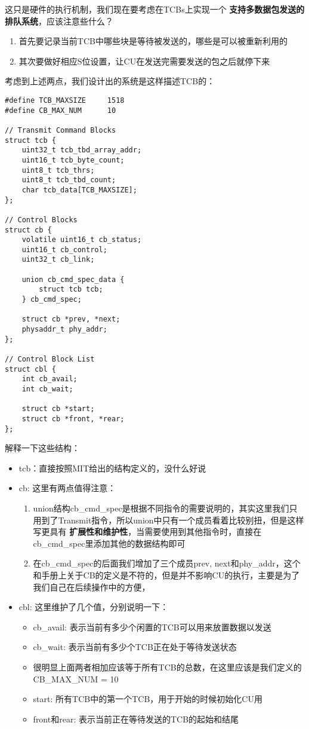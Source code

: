 \documentclass{article}
\newcommand{\highlight}[1]{{\bfseries \color{red}  #1}}
\begin{document}
\begin{CJK*}{UTF8}{gkai}
这只是硬件的执行机制，我们现在要考虑在TCBs上实现一个\highlight{支持多数据包发送的排队系统}，应该注意些什么？

\begin{enumerate}
\item{首先要记录当前TCB中哪些块是等待被发送的，哪些是可以被重新利用的}
\item{其次要做好相应S位设置，让CU在发送完需要发送的包之后就停下来}
\end{enumerate}

考虑到上述两点，我们设计出的系统是这样描述TCB的：

\begin{lstlisting}[style=ccode, title={\scriptsize \ttfamily \bfseries kern/e100.h}]
#define TCB_MAXSIZE     1518
#define CB_MAX_NUM      10

// Transmit Command Blocks
struct tcb {
    uint32_t tcb_tbd_array_addr;
    uint16_t tcb_byte_count;
    uint8_t tcb_thrs;
    uint8_t tcb_tbd_count;
    char tcb_data[TCB_MAXSIZE];
};

// Control Blocks
struct cb {
    volatile uint16_t cb_status;
    uint16_t cb_control;
    uint32_t cb_link;

    union cb_cmd_spec_data {
        struct tcb tcb;
    } cb_cmd_spec;

    struct cb *prev, *next;
    physaddr_t phy_addr;   
};

// Control Block List
struct cbl {
    int cb_avail;
    int cb_wait;

    struct cb *start;
    struct cb *front, *rear;
};
\end{lstlisting}

解释一下这些结构：

\begin{itemize}
\item{tcb：直接按照MIT给出的结构定义的，没什么好说}
\item{cb: 这里有两点值得注意：
\begin{enumerate}
\item{union结构cb\_cmd\_spec是根据不同指令的需要说明的，其实这里我们只用到了Transmit指令，所以union中只有一个成员看着比较别扭，但是这样写更具有\highlight{扩展性和维护性}，当需要使用到其他指令时，直接在cb\_cmd\_spec里添加其他的数据结构即可}
\item{在cb\_cmd\_spec的后面我们增加了三个成员prev, next和phy\_addr，这个和手册上关于CB的定义是不符的，但是并不影响CU的执行，主要是为了我们自己在后续操作中的方便，}
\end{enumerate}
}
\item{cbl: 这里维护了几个值，分别说明一下：
\begin{itemize}
\item{cb\_avail: 表示当前有多少个闲置的TCB可以用来放置数据以发送}
\item{cb\_wait: 表示当前有多少个TCB正在处于等待发送状态}
\item{很明显上面两者相加应该等于所有TCB的总数，在这里应该是我们定义的CB\_MAX\_NUM = 10}
\item{start: 所有TCB中的第一个TCB，用于开始的时候初始化CU用}
\item{front和rear: 表示当前正在等待发送的TCB的起始和结尾}


\end{itemize}}
\end{itemize}
\end{CJK*}
\end{document}
